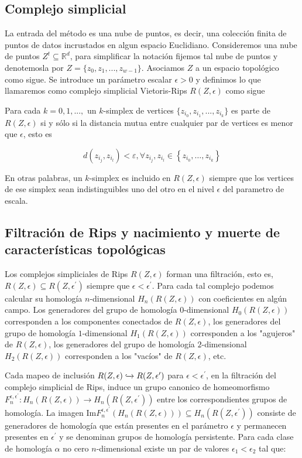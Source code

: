 \subsection{Complejo simplicial}

La entrada del método es una nube de puntos, es decir, una colección finita de puntos de datos incrustados en algun espacio Euclidiano. Consideremos una nube de puntos ${Z^t} \subseteq  \mathbb{R}^{d}$, para simplificar la notación fijemos tal nube de puntos y denotemosla por $Z=\{z_0,z_1,...,z_{w-1}\}$. Asociamos $Z$ a un espacio topológico como sigue. Se introduce un parámetro escalar $\epsilon > 0$ y definimos lo que llamaremos como complejo simplicial Vietoris-Rips $R(Z,\epsilon)$ como sigue

Para cada $k=0,1,...,$ un $k$-simplex de vertices $\{ z_{i_0},z_{i_1},...,z_{i_k} \}$ es parte de $R(Z,\epsilon)$ si y sólo si la distancia mutua entre cualquier par de vertices es menor que $\epsilon$, esto es

\[
d\left(z_{i_{j}}, z_{i_{l}}\right)<\varepsilon, \forall z_{i_{j}}, z_{i_{l}} \in\left\{z_{i_{0}}, \ldots, z_{i_{k}}\right\}
\]

En otras palabras, un $k$-simplex es incluido en $R(Z,\epsilon)$ siempre que los vertices de ese simplex sean indistinguibles uno del otro en el nivel $\epsilon$ del parametro de escala.

\subsection{Filtración de Rips y nacimiento y muerte de características topológicas}

Los complejos simpliciales de Rips $R(Z,\epsilon)$ forman una filtración, esto es, $R(Z,\epsilon) \subseteq R(Z,\epsilon^{\prime})$ siempre que $\epsilon < \epsilon^{\prime} $. Para cada tal complejo podemos calcular su homología $n$-dimensional $H_n(R(Z,\epsilon))$ con coeficientes en algún campo. Los generadores del grupo de homología $0$-dimensional $H_0(R(Z,\epsilon))$ corresponden a los componentes conectados de $R(Z,\epsilon)$, los generadores del grupo de homología $1$-dimensional $H_1(R(Z,\epsilon))$ corresponden a los "agujeros" de $R(Z,\epsilon)$, los generadores del grupo de homología $2$-dimensional $H_2(R(Z,\epsilon))$ corresponden a los "vacíos" de $R(Z,\epsilon)$, etc.

Cada mapeo de inclusión $R(Z,\epsilon) \xhookrightarrow{} R(Z,\epsilon^{\prime})$ para $\epsilon < \epsilon^{\prime}$, en la filtración del complejo simplicial de Rips, induce un grupo canonico de homeomorfismo $F_n^{\epsilon,\epsilon^{\prime}}:H_n(R(Z,\epsilon)) \to H_n(R(Z,\epsilon^{\prime}))$ entre los correspondientes grupos de homología. La imagen Im$F_n^{\epsilon,\epsilon^{\prime}}(H_n(R(Z,\epsilon))) \subseteq  H_n(R(Z,\epsilon^{\prime})) $ consiste de generadores de homología que están presentes en el parámetro $\epsilon$ y permanecen presentes en $\epsilon^{\prime}$ y se denominan grupos de homología persistente. Para cada clase de homología $\alpha$ no cero $n$-dimensional existe un par de valores $\epsilon_1 < \epsilon_2$ tal que:

